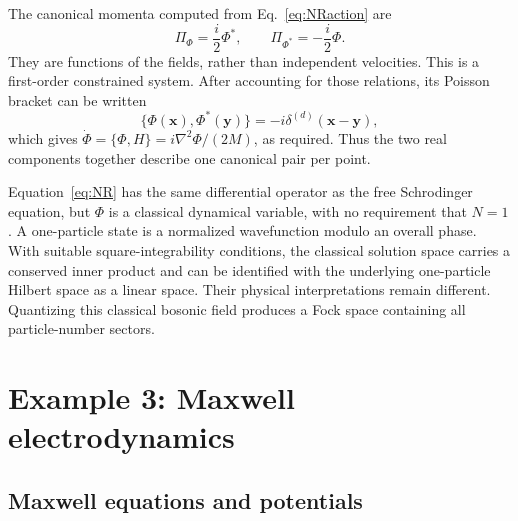 \documentclass[11pt]{article}
\begin{document}
The canonical momenta computed from Eq.~\eqref{eq:NRaction} are
\begin{equation}
\Pi_\Phi=\frac{i}{2}\Phi^*,\qquad
\Pi_{\Phi^*}=-\frac{i}{2}\Phi.
\end{equation}
They are functions of the fields, rather than independent velocities.
This is a first-order constrained system. After accounting for those
relations, its Poisson bracket can be written
\begin{equation}
\{\Phi(\bm x),\Phi^*(\bm y)\}=-i\delta^{(d)}(\bm x-\bm y),
\end{equation}
which gives \(\dot\Phi=\{\Phi,H\}=i\nabla^2\Phi/(2M)\), as required.
Thus the two real components together describe one canonical pair per point.

\begin{remarkbox}
Equation~\eqref{eq:NR} has the same differential operator as the free
Schrodinger equation, but \(\Phi\) is a classical dynamical variable, with no
requirement that \(N=1\). A one-particle state is a normalized wavefunction
modulo an overall phase. With suitable square-integrability conditions,
the classical solution space carries a conserved inner product and can be
identified with the underlying one-particle Hilbert space as a linear
space. Their physical interpretations remain different. Quantizing this
classical bosonic field produces a Fock space containing all particle-number
sectors.
\end{remarkbox}

\section{Example 3: Maxwell electrodynamics}

\subsection{Maxwell equations and potentials}
\end{document}
